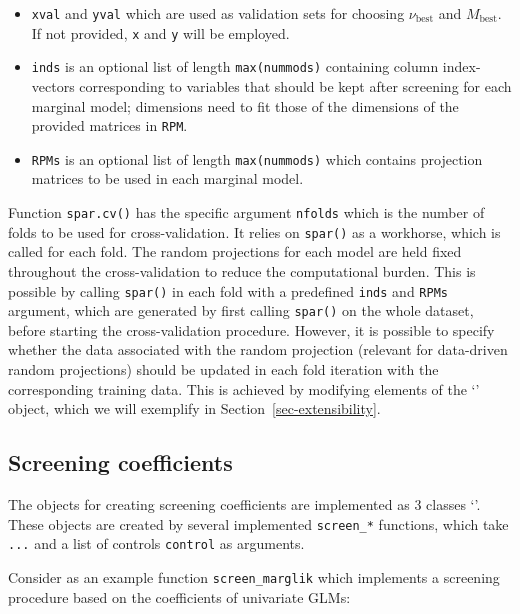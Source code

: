 \documentclass[
  article]{jss}
\newcommand{\class}[1]{`\code{#1}'}
\begin{document}
\begin{itemize}
\item
  \texttt{xval} and \texttt{yval} which are used as validation sets for
  choosing \(\nu_\text{best}\) and \(M_\text{best}\). If not provided,
  \texttt{x} and \texttt{y} will be employed.
\item
  \texttt{inds} is an optional list of length \texttt{max(nummods)}
  containing column index-vectors corresponding to variables that should
  be kept after screening for each marginal model; dimensions need to
  fit those of the dimensions of the provided matrices in \texttt{RPM}.
\item
  \texttt{RPMs} is an optional list of length \texttt{max(nummods)}
  which contains projection matrices to be used in each marginal model.
\end{itemize}

Function \texttt{spar.cv()} has the specific argument \texttt{nfolds}
which is the number of folds to be used for cross-validation. It relies
on \texttt{spar()} as a workhorse, which is called for each fold. The
random projections for each model are held fixed throughout the
cross-validation to reduce the computational burden. This is possible by
calling \texttt{spar()} in each fold with a predefined \texttt{inds} and
\texttt{RPMs} argument, which are generated by first calling
\texttt{spar()} on the whole dataset, before starting the
cross-validation procedure. However, it is possible to specify whether
the data associated with the random projection (relevant for data-driven
random projections) should be updated in each fold iteration with the
corresponding training data. This is achieved by modifying elements of
the \class{randomprojection} object, which we will exemplify in
Section~\ref{sec-extensibility}.

\subsection{Screening coefficients}\label{screening-coefficients}

The objects for creating screening coefficients are implemented as
3 classes \class{screencoef}. These objects are created by
several implemented \texttt{screen\_*} functions, which take
\texttt{...} and a list of controls \texttt{control} as arguments.

Consider as an example function \texttt{screen\_marglik} which
implements a screening procedure based on the coefficients of univariate
GLMs:
\end{document}
